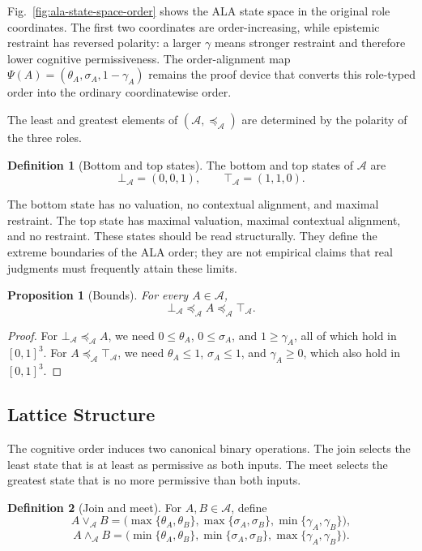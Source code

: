 \documentclass[reqno,final]{amsart}
\theoremstyle{definition}
\newtheorem{definition}{Definition}
\theoremstyle{plain}
\newtheorem{proposition}{Proposition}
\theoremstyle{remark}
\providecommand{\cA}{\mathcal{A}}
\providecommand{\preceqA}{\preceq_{\mathcal A}}
\begin{document}
Fig.~\ref{fig:ala-state-space-order} shows the ALA state space in the original role coordinates. The first two coordinates are order-increasing, while epistemic restraint has reversed polarity: a larger \(\gamma\) means stronger restraint and therefore lower cognitive permissiveness. The order-alignment map \(\Psi(A)=(\theta_A,\sigma_A,1-\gamma_A)\) remains the proof device that converts this role-typed order into the ordinary coordinatewise order.

The least and greatest elements of \((\cA,\preceqA)\) are determined by the polarity of the three roles.

\begin{definition}[Bottom and top states]
The bottom and top states of \(\cA\) are
\begin{equation}
\bot_{\cA}=(0,0,1),
\qquad
\top_{\cA}=(1,1,0).
\label{eq:bottom-top-ala}
\end{equation}
\end{definition}

The bottom state has no valuation, no contextual alignment, and maximal restraint. The top state has maximal valuation, maximal contextual alignment, and no restraint. These states should be read structurally. They define the extreme boundaries of the ALA order; they are not empirical claims that real judgments must frequently attain these limits.

\begin{proposition}[Bounds]
For every \(A\in\cA\),
\[
\bot_{\cA}\preceqA A\preceqA \top_{\cA}.
\]
\end{proposition}

\begin{proof}
For \(\bot_{\cA}\preceqA A\), we need \(0\leq\theta_A\), \(0\leq\sigma_A\), and \(1\geq\gamma_A\), all of which hold in \([0,1]^3\). For \(A\preceqA\top_{\cA}\), we need \(\theta_A\leq1\), \(\sigma_A\leq1\), and \(\gamma_A\geq0\), which also hold in \([0,1]^3\).
\end{proof}

\subsection{Lattice Structure}
The cognitive order induces two canonical binary operations. The join selects the least state that is at least as permissive as both inputs. The meet selects the greatest state that is no more permissive than both inputs.

\begin{definition}[Join and meet]
For \(A,B\in\cA\), define
\begin{equation}
A\vee_{\cA}B=
\bigl(\max\{\theta_A,\theta_B\},\max\{\sigma_A,\sigma_B\},\min\{\gamma_A,\gamma_B\}\bigr),
\label{eq:ala-join}
\end{equation}
\begin{equation}
A\wedge_{\cA}B=
\bigl(\min\{\theta_A,\theta_B\},\min\{\sigma_A,\sigma_B\},\max\{\gamma_A,\gamma_B\}\bigr).
\label{eq:ala-meet}
\end{equation}
\end{definition}
\end{document}
